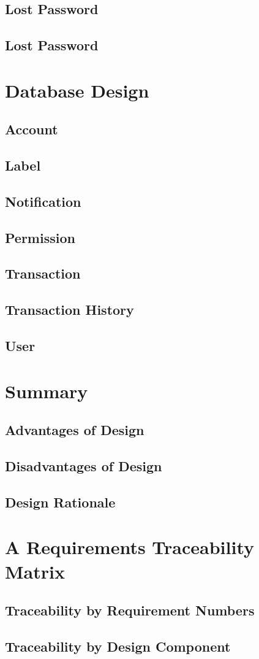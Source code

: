 \documentclass{article}
\begin{document}
\subsection{Lost Password}
\subsection{Lost Password}
\section{Database Design}
\subsection{Account}
\subsection{Label}
\subsection{Notification}
\subsection{Permission}
\subsection{Transaction}
\subsection{Transaction History   }
\subsection{User}
\section{Summary}
\subsection{Advantages of Design}
\subsection{Disadvantages of Design}
\subsection{Design Rationale}
\section{A Requirements Traceability Matrix}
\subsection{Traceability by Requirement Numbers}
\subsection{Traceability by Design Component}
\end{document}
